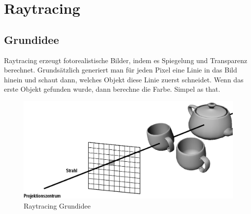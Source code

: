 \chapter{Raytracing}
\section{Grundidee}
Raytracing erzeugt fotorealistische Bilder, indem es Spiegelung und Transparenz berechnet. Grundsätzlich generiert man für jeden Pixel eine Linie in das Bild hinein und schaut dann, welches Objekt diese Linie zuerst schneidet. Wenn das erste Objekt gefunden wurde, dann berechne die Farbe. Simpel as that.
\begin{figure}[!ht]
	\centering
	\includegraphics[width=0.4\linewidth]{fig/raytracing}
	\caption{Raytracing Grundidee}
	\label{fig:raytracing}
\end{figure}

